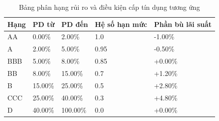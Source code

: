 \begin{table}[!htbp]
\centering
\caption{Bảng phân hạng rủi ro và điều kiện cấp tín dụng tương ứng}
\label{tab:risk-bands}
\small
\setlength{\tabcolsep}{5.0pt}
\begin{tabular}{@{}L{2.4cm}R{2.6cm}R{2.6cm}R{2.6cm}R{2.6cm}@{}}
\toprule
\textbf{Hạng} & \textbf{PD từ} & \textbf{PD đến} & \textbf{Hệ số hạn mức} & \textbf{Phần bù lãi suất} \\
\midrule
AA & 0.00\% & 2.00\% & 1.0 & -1.00\% \\
A & 2.00\% & 5.00\% & 0.95 & -0.50\% \\
BBB & 5.00\% & 8.00\% & 0.85 & +0.00\% \\
BB & 8.00\% & 15.00\% & 0.7 & +1.20\% \\
B & 15.00\% & 25.00\% & 0.5 & +2.80\% \\
CCC & 25.00\% & 40.00\% & 0.3 & +4.80\% \\
D & 40.00\% & 100.00\% & 0.0 & +0.00\% \\
\bottomrule
\end{tabular}
\end{table}
